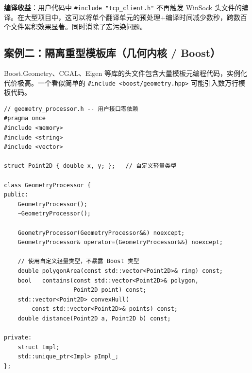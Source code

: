 \documentclass[12pt,a4paper,fontset=fandol]{ctexbook}
\begin{document}
\textbf{编译收益}：用户代码中 \texttt{\#include "tcp\_client.h"} 不再触发 WinSock 头文件的编译。在大型项目中，这可以将单个翻译单元的预处理+编译时间减少数秒，跨数百个文件累积效果显著。同时消除了宏污染问题。

\subsection{案例二：隔离重型模板库（几何内核 / Boost）}

Boost.Geometry、CGAL、Eigen 等库的头文件包含大量模板元编程代码，实例化代价极高。一个看似简单的 \texttt{\#include <boost/geometry.hpp>} 可能引入数万行模板代码。

\begin{lstlisting}[caption={几何处理器——PImpl 隔离 Boost.Geometry}]
// geometry_processor.h -- 用户接口零依赖
#pragma once
#include <memory>
#include <string>
#include <vector>

struct Point2D { double x, y; };   // 自定义轻量类型

class GeometryProcessor {
public:
    GeometryProcessor();
    ~GeometryProcessor();

    GeometryProcessor(GeometryProcessor&&) noexcept;
    GeometryProcessor& operator=(GeometryProcessor&&) noexcept;

    // 使用自定义轻量类型，不暴露 Boost 类型
    double polygonArea(const std::vector<Point2D>& ring) const;
    bool   contains(const std::vector<Point2D>& polygon,
                    Point2D point) const;
    std::vector<Point2D> convexHull(
        const std::vector<Point2D>& points) const;
    double distance(Point2D a, Point2D b) const;

private:
    struct Impl;
    std::unique_ptr<Impl> pImpl_;
};
\end{lstlisting}
\end{document}
